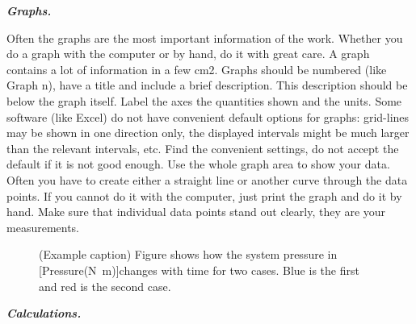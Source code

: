 \documentclass{scrartcl}
\begin{document}
\textbf{\textit{Graphs.}} 

Often the graphs are the most important information of the work.
Whether you do a graph with the computer or by hand, do it with great care.
A graph contains a lot of information in a few cm2.
Graphs should be numbered (like Graph n), have a title and include a brief description.
This description should be below the graph itself. Label the axes the quantities shown and the units.
Some software (like Excel) do not have convenient default options for graphs:
grid-lines may be shown in one direction only, the displayed intervals might be much larger than the relevant intervals, etc. 
Find the convenient settings, do not accept the default if it is not good enough.
Use the whole graph area to show your data. Often you have to create either a straight line or another curve through the data points.
If you cannot do it with the computer, just print the graph and do it by hand.
Make sure that individual data points stand out clearly, they are your measurements.


\begin{figure}[h] %
    \centering
    \caption{(Example caption) Figure shows how the system pressure in [Pressure(\si{\newton\metre})]changes with time for two cases.
    Blue is the first and red is the second case.}
    \label{fig:merkimiði_myndar}
\end{figure}

\textbf{\textit{Calculations.}} 
\end{document}
